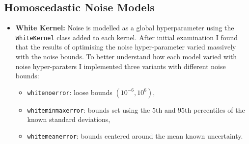 \documentclass{ucdgradtaughtthesis}
\begin{document}
\noindent
\subsection{Homoscedastic Noise Models}
\begin{itemize}
    \item \textbf{White Kernel:} Noise is modelled as a global hyperparameter using the \texttt{WhiteKernel} class added to each kernel.
    After initial examination I found that the results of optimising the noise hyper-parameter varied massively with the noise bounds. 
    To better understand how each model varied with noise hyper-paraters I implemented three variants with different noise bounds:
    \begin{itemize}
        \item \texttt{whitenoerror}: loose bounds \((10^{-6}, 10^6)\),
        \item \texttt{whiteminmaxerror}: bounds set using the 5th and 95th percentiles of the known standard deviations,
        \item \texttt{whitemeanerror}: bounds centered around the mean known uncertainty.
    \end{itemize}
\end{itemize}
%
%
\end{document}
